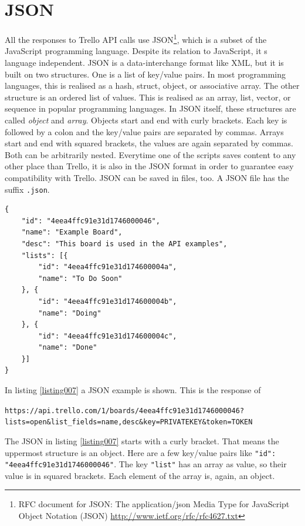 \section{JSON}\label{jsonsec}
All the responses to Trello API calls use JSON\footnote{RFC document for JSON: The application/json Media Type for JavaScript Object Notation (JSON)  \url{http://www.ietf.org/rfc/rfc4627.txt}}, which is a subset of the JavaScript programming language. Despite its relation to JavaScript, it s language independent. JSON is a data-interchange format like XML, but it is built on two structures. One is a list of key/value pairs. In most programming languages, this is realised as a hash, struct, object, or associative array. The other structure is an ordered list of values. This is realised as an array, list, vector, or sequence in popular programming languages. In JSON itself, these structures are called \emph{object} and \emph{array}. Objects start and end with curly brackets. Each key is followed by a colon and the key/value pairs are separated by commas. Arrays start and end with squared brackets, the values are again separated by commas. Both can be arbitrarily nested. Everytime one of the scripts saves content to any other place than Trello, it is also in the JSON format in order to guarantee easy compatibility with Trello. JSON can be saved in files, too. A JSON file has the suffix \texttt{.json}. \cite{json}

\begin{lstlisting}[aboveskip=1\baselineskip, caption=JSON example., label=listing007]
{
    "id": "4eea4ffc91e31d1746000046",
    "name": "Example Board",
    "desc": "This board is used in the API examples",
    "lists": [{
        "id": "4eea4ffc91e31d174600004a",
        "name": "To Do Soon"
    }, {
        "id": "4eea4ffc91e31d174600004b",
        "name": "Doing"
    }, {
        "id": "4eea4ffc91e31d174600004c",
        "name": "Done"
    }]
}
\end{lstlisting}

In listing \ref{listing007}\alena{,} a JSON example is shown. This is the response of

\begin{center}
\texttt{https://api.trello.com/1/boards/4eea4ffc91e31d1746000046? lists=open\&list\_fields=name,desc\&key=PRIVATEKEY\&token=TOKEN}
\end{center}

The JSON in listing \ref{listing007} starts with a curly bracket. That means the uppermost structure is an object. Here are a few key/value pairs like \texttt{"id": "4eea4ffc91e31d1746000046"}. The key \texttt{"list"} has an array as value, so their value is in squared brackets. Each element of the array is, again, an object.

